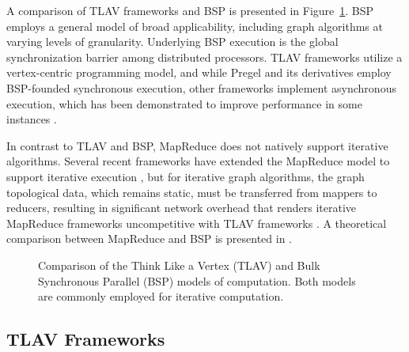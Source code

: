\documentclass[reprint,twocolumn,showpacs,preprintnumbers,amsmath, aps,pre,amssymb]{revtex4-1}
\begin{document}
A comparison of TLAV frameworks and BSP is presented in Figure~\ref{fig:bspvstlav}.  BSP employs a general model of broad applicability, including graph algorithms at varying levels of granularity.  Underlying BSP execution is the global synchronization barrier among distributed processors.  TLAV frameworks utilize a vertex-centric programming model, and while Pregel and its derivatives employ BSP-founded synchronous execution, other frameworks implement asynchronous execution, which has been demonstrated to improve performance in some instances \cite{Xie2013}.  

In contrast to TLAV and BSP, MapReduce does not natively support iterative algorithms.  Several recent frameworks have extended the MapReduce model to support iterative execution \cite{Kajdanowicz2014}, but for iterative graph algorithms, the graph topological data, which remains static, must be transferred from mappers to reducers, resulting in significant network overhead that renders iterative MapReduce frameworks uncompetitive with TLAV frameworks \cite{Kajdanowicz2014}.  A theoretical comparison between MapReduce and BSP is presented in \cite{bspvsmr}.

\begin{figure}
\centering
\def\firstcircle{(0,0) circle (1.4cm)}
\def\secondcircle{(0:5cm) circle (1.4cm)}
\def\thirdcircle{(0:1.6cm) circle (1.4cm)}


\caption{Comparison of the Think Like a Vertex (TLAV) and Bulk Synchronous Parallel (BSP) models of computation.  Both models are commonly employed for iterative computation.}

\label{fig:bspvstlav}

\end{figure}

\subsection{TLAV Frameworks}
\end{document}
